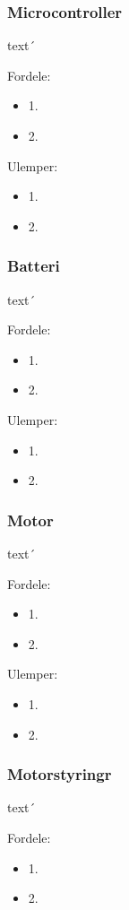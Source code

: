\subsubsection*{\textbf{Microcontroller}}
text´

Fordele: 
\begin{itemize}
\item 1.
\item 2.
\end{itemize}

Ulemper: 
\begin{itemize}
\item 1.
\item 2.
\end{itemize}


\subsubsection*{\textbf{Batteri}}
text´

Fordele: 
\begin{itemize}
\item 1.
\item 2.
\end{itemize}

Ulemper: 
\begin{itemize}
\item 1.
\item 2.
\end{itemize}


\subsubsection*{\textbf{Motor}}
text´

Fordele: 
\begin{itemize}
\item 1.
\item 2.
\end{itemize}

Ulemper: 
\begin{itemize}
\item 1.
\item 2.
\end{itemize}


\subsubsection*{\textbf{Motorstyringr}}
text´

Fordele: 
\begin{itemize}
\item 1.
\item 2.
\end{itemize}

